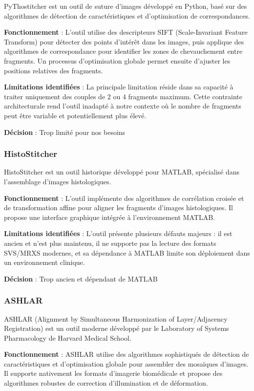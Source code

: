 \documentclass[11pt,a4paper]{report}
\begin{document}
PyThostitcher est un outil de suture d'images développé en Python, basé sur des algorithmes de détection de caractéristiques et d'optimisation de correspondances.

\textbf{Fonctionnement} : L'outil utilise des descripteurs SIFT (Scale-Invariant Feature Transform) pour détecter des points d'intérêt dans les images, puis applique des algorithmes de correspondance pour identifier les zones de chevauchement entre fragments. Un processus d'optimisation globale permet ensuite d'ajuster les positions relatives des fragments.

\textbf{Limitations identifiées} : La principale limitation réside dans sa capacité à traiter uniquement des couples de 2 ou 4 fragments maximum. Cette contrainte architecturale rend l'outil inadapté à notre contexte où le nombre de fragments peut être variable et potentiellement plus élevé.

\textbf{Décision} : Trop limité pour nos besoins

\subsubsection{HistoStitcher}

HistoStitcher est un outil historique développé pour MATLAB, spécialisé dans l'assemblage d'images histologiques.

\textbf{Fonctionnement} : L'outil implémente des algorithmes de corrélation croisée et de transformation affine pour aligner les fragments d'images histologiques. Il propose une interface graphique intégrée à l'environnement MATLAB.

\textbf{Limitations identifiées} : L'outil présente plusieurs défauts majeurs : il est ancien et n'est plus maintenu, il ne supporte pas la lecture des formats SVS/MRXS modernes, et sa dépendance à MATLAB limite son déploiement dans un environnement clinique.

\textbf{Décision} : Trop ancien et dépendant de MATLAB

\subsubsection{ASHLAR}

ASHLAR (Alignment by Simultaneous Harmonization of Layer/Adjacency Registration) est un outil moderne développé par le Laboratory of Systems Pharmacology de Harvard Medical School.

\textbf{Fonctionnement} : ASHLAR utilise des algorithmes sophistiqués de détection de caractéristiques et d'optimisation globale pour assembler des mosaïques d'images. Il supporte nativement les formats d'imagerie biomédicale et propose des algorithmes robustes de correction d'illumination et de déformation.
\end{document}
